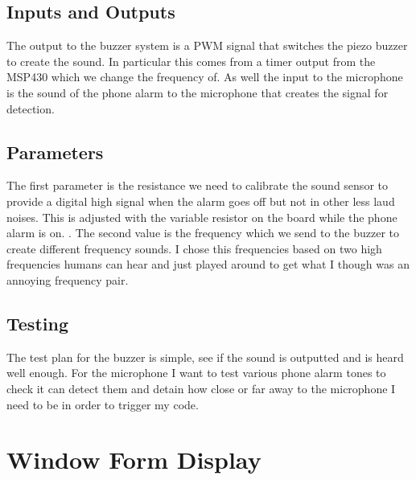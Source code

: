 \documentclass[11pt]{article}
\begin{document}
\subsection*{Inputs and Outputs}
The output to the buzzer system is a PWM signal that switches the piezo buzzer to create the sound.
In particular this comes from a timer output from the MSP430 which we change the frequency of. 
As well the input to the microphone is the sound of the phone alarm to the microphone that creates the signal for detection.

\subsection*{Parameters}
The first parameter is the resistance we need to calibrate the sound sensor to provide a digital high signal when the alarm goes off but not in other less laud noises.
This is adjusted with the variable resistor on the board while the phone alarm is on. .
The second value is the frequency which we send to the buzzer to create different frequency sounds.
I chose this frequencies based on two high frequencies humans can hear and just played around to get what I though was an annoying frequency pair.    

\subsection*{Testing}
The test plan for the buzzer is simple, see if the sound is outputted and is heard well enough. 
For the microphone I want to test various phone alarm tones to check it can detect them and detain how close or far away to the microphone I need to be in order to trigger my code. 
 
 
\section{Window Form Display}
\end{document}
